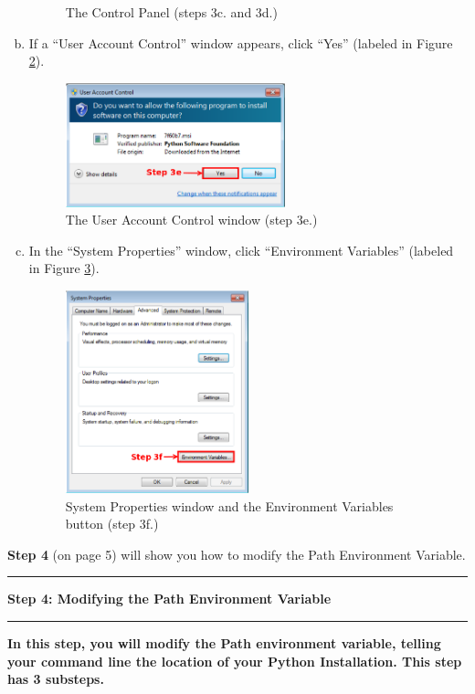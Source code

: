 \documentclass[11pt,english]{article}
\newcommand{\myhrule}{\vspace{0.3cm}\hrule\vspace{0.3cm}}
\begin{document}
\begin{enumerate}[a.]
\begin{figure}[h]
\vspace{-0.5cm}
\caption{The Control Panel (steps 3c. and 3d.)}
\label{fig:dia5}
\end{figure}
\item If a ``User Account Control'' window appears, click ``Yes'' (labeled in
Figure \ref{fig:dia11}).
\begin{figure}[h]
\begin{center}
\includegraphics[width=0.6\textwidth]{dia11}
\end{center}
\caption{The User Account Control window (step 3e.)}
\label{fig:dia11}
\end{figure}
\item In the ``System Properties'' window, click ``Environment
Variables'' (labeled in Figure \ref{fig:dia6}).
\begin{figure}[h]
\begin{center}
\includegraphics[width=0.5\textwidth]{dia6}
\end{center}
\vspace{-0.5cm}
\caption{System Properties window and the Environment Variables button (step
3f.)}
\label{fig:dia6}
\end{figure}
\end{enumerate}
\vfill
{\bf Step 4} (on page 5) will show you how to modify the Path Environment
Variable.
\myhrule

\newpage
{\Large {\bf Step 4: Modifying the Path Environment Variable}}
\myhrule
{\bf In this step, you will modify the Path environment variable, telling your
command line the location of your Python Installation. This step has
3 substeps.}\\
\end{document}
